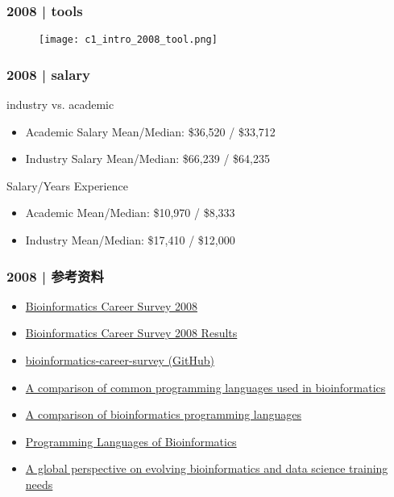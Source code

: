 \begin{frame}
  \frametitle{2008 | tools}
   \begin{figure}
     \centering
     \texttt{[image: c1\_intro\_2008\_tool.png]}
   \end{figure}
\end{frame}

\begin{frame}
  \frametitle{2008 | salary}
  \begin{block}{industry vs. academic}
    \begin{itemize}
      \item Academic Salary Mean/Median: \$36,520 / \$33,712
      \item Industry Salary Mean/Median: \$66,239 / \$64,235
    \end{itemize}
  \end{block}
  \pause
  \begin{block}{Salary/Years Experience}
    \begin{itemize}
      \item Academic Mean/Median: \$10,970 / \$8,333
      \item Industry Mean/Median: \$17,410 / \$12,000
    \end{itemize}
  \end{block}
\end{frame}

\begin{frame}
  \frametitle{2008 | 参考资料}
  \begin{itemize}
    \item \href{http://openwetware.org/wiki/Biogang:Projects/Nioinformatics\_Career\_Survey\_2008}{Bioinformatics Career Survey 2008}
    \item \href{http://openwetware.org/wiki/Biogang:Projects/Bioinformatics\_Career\_Survey\_2008\_Results}{Bioinformatics Career Survey 2008 Results}
    \item \href{https://github.com/michaelbarton/bioinformatics-career-survey}{bioinformatics-career-survey (GitHub)}
    \item \href{http://www.ncbi.nlm.nih.gov/pmc/articles/PMC2267699/}{A comparison of common programming languages used in bioinformatics}
    \item \href{http://www.molecularecologist.com/2012/11/a-comparison-of-bioinformatics-programming-languages/}{A comparison of bioinformatics programming languages}
    \item \href{https://nlcb.wordpress.com/2013/02/23/programming-languages-of-bioinformatics-2/}{Programming Languages of Bioinformatics}
    \item \href{https://www.ncbi.nlm.nih.gov/pubmed/28968751}{A global perspective on evolving bioinformatics and data science training needs}
  \end{itemize}
\end{frame}

